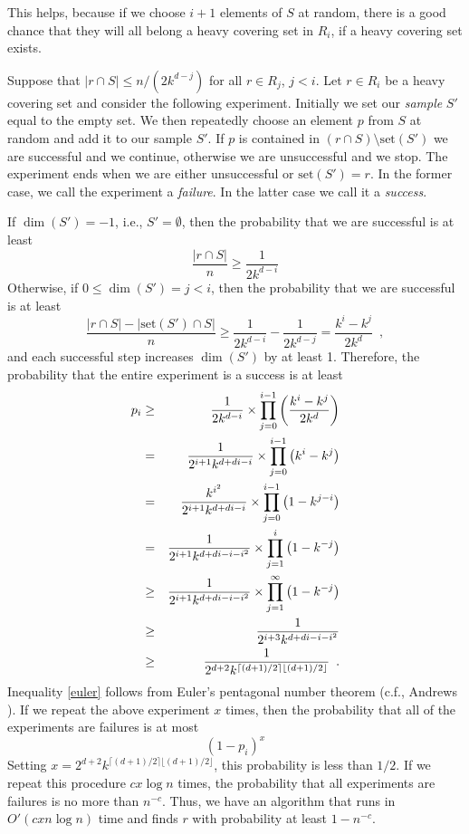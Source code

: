 \documentclass[ccfonts,lotsofwhite]{patmorin}
\newcommand{\notenets}[1]{#1}
\newcommand{\set}{\mathrm{set}}
\newcommand{\exponent}{\lceil(d+1)/2\rceil\lfloor(d+1)/2\rfloor}
\begin{document}
\notenets{
This helps, because if we choose $i+1$ elements of $S$ at
random, there is a good chance that they will all belong a heavy
covering set in $R_i$, if a heavy covering set exists.

Suppose that $|r\cap S|\le n/(2k^{d-j})$ for all $r\in R_j$, $j<i$.
Let $r\in R_i$ be a heavy covering set and consider the following
experiment.  Initially we set our \emph{sample} $S'$ equal to the
empty set.  We then repeatedly choose an element $p$ from $S$ at
random and add it to our sample $S'$.  If $p$ is contained in $(r\cap
S)\setminus \set(S')$ we are successful and we continue, otherwise we
are unsuccessful and we stop.  The experiment ends when we are either
unsuccessful or $\set(S')=r$.  In the former case, we call the
experiment a \emph{failure}.  In the latter case we call it a
\emph{success}.

If $\dim(S')=-1$, i.e., $S'=\emptyset$, then the probability that we
are successful is at least
\[
\frac{|r\cap S|}{n} \ge \frac{1}{2k^{d-i}}
\]
Otherwise, if $0\le \dim(S')=j<i$, then the probability that we are
successful is at least
\[
\frac{|r\cap S|-|\set(S')\cap S|}{n} \ge \frac{1}{2k^{d-i}}-\frac{1}{2k^{d-j}}
	= \frac{k^{i}-k^{j}}{2k^d}\enspace ,
\]
and each successful step increases $\dim(S')$ by at least 1.
Therefore, the probability that the entire experiment is a success is
at least
\begin{eqnarray}
  p_i & \ge & \frac{1}{2k^{d-i}}\times\prod_{j=0}^{i-1}\left(\frac{k^{i}-k^{j}}{2k^{d}}\right) \\
	& = & \frac{1}{2^{i+1}k^{d+di-i}}\times\prod_{j=0}^{i-1}\left(k^{i}-k^{j}\right) \\
	& = & \frac{k^{i^2}}{2^{i+1}k^{d+di-i}}\times\prod_{j=0}^{i-1}\left(1-k^{j-i}\right) \\
	& = & \frac{1}{2^{i+1}k^{d+di-i-i^2}}\times\prod_{j=1}^{i}\left(1-k^{-j}\right) \\
	& \ge & \frac{1}{2^{i+1}k^{d+di-i-i^2}}\times\prod_{j=1}^{\infty}\left(1-k^{-j}\right) \\
	& \ge & \frac{1}{2^{i+3}k^{d+di-i-i^2}} \eqlabel{euler} \\
	& \ge & \frac{1}{2^{d+2}k^{\exponent}}
		\enspace .
\end{eqnarray}
Inequality \eqref{euler} follows from Euler's pentagonal number
theorem \cite[Chapter~16]{e48} (c.f., Andrews \cite{a76}).  If we
repeat the above experiment $x$ times, then the probability that all
of the experiments are failures is at most
\[
   (1-p_i)^x
\]
Setting $x=2^{d+2}k^{\exponent}$, this probability is less
than $1/2$.  If we repeat this procedure $cx\log n$ times, the
probability that all experiments are failures is no more than
$n^{-c}$.  Thus, we have an algorithm that runs in $O'(cxn\log n)$
time and finds $r$ with probability at least $1-n^{-c}$.

}
\end{document}
